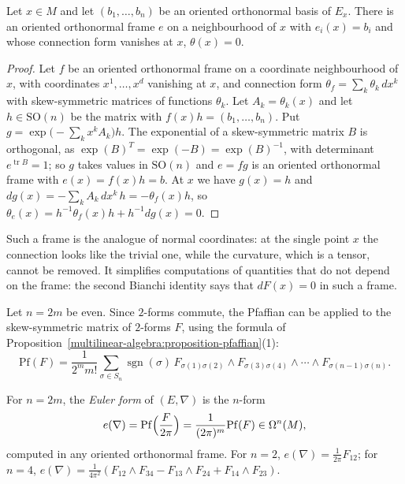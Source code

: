 \begin{lemma}\label{characteristic-classes:lemma-normal-frames}
Let $x \in M$ and let $(b_1, \ldots, b_n)$ be an oriented orthonormal basis of $E_x$. There is an oriented orthonormal frame $e$ on a neighbourhood of $x$ with $e_i(x) = b_i$ and whose
connection form vanishes at $x$, $\theta(x) = 0$.
\end{lemma}

\begin{proof}
Let $f$ be an oriented orthonormal frame on a coordinate neighbourhood of $x$, with coordinates $x^1, \ldots, x^d$ vanishing at $x$, and connection form $\theta_f = \sum_k\theta_k\,dx^k$
with skew-symmetric matrices of functions $\theta_k$. Let $A_k = \theta_k(x)$ and let $h \in \mathrm{SO}(n)$ be the matrix with $f(x)h = (b_1, \ldots, b_n)$. Put
$g = \exp\bigl(-\sum_kx^kA_k\bigr)h$. The exponential of a skew-symmetric matrix $B$ is orthogonal, as $\exp(B)^T = \exp(-B) = \exp(B)^{-1}$, with determinant $e^{\operatorname{tr}B} = 1$; so
$g$ takes values in $\mathrm{SO}(n)$ and $e = fg$ is an oriented orthonormal frame with $e(x) = f(x)h = b$. At $x$ we have $g(x) = h$ and $dg(x) = -\sum_kA_k\,dx^k\,h = -\theta_f(x)h$,
so $\theta_e(x) = h^{-1}\theta_f(x)h + h^{-1}dg(x) = 0$.
\end{proof}

Such a frame is the analogue of normal coordinates: at the single point $x$ the connection looks like the trivial one, while the curvature, which is a tensor, cannot be removed. It
simplifies computations of quantities that do not depend on the frame: the second Bianchi identity says that $dF(x) = 0$ in such a frame.

Let $n = 2m$ be even. Since $2$-forms commute, the Pfaffian can be applied to the skew-symmetric matrix of $2$-forms $F$, using the formula of
Proposition~\ref{multilinear-algebra:proposition-pfaffian}(1):
\[
\mathrm{Pf}(F) = \frac{1}{2^mm!}\sum_{\sigma \in S_n}\operatorname{sgn}(\sigma)\,F_{\sigma(1)\sigma(2)} \wedge F_{\sigma(3)\sigma(4)} \wedge \cdots \wedge F_{\sigma(n-1)\sigma(n)} .
\]

\begin{definition}\label{characteristic-classes:definition-euler-form}
For $n = 2m$, the \emph{Euler form} of $(E, \nabla)$ is the $n$-form
\[
e(\nabla) = \mathrm{Pf}\Bigl(\frac{F}{2\pi}\Bigr) = \frac{1}{(2\pi)^m}\mathrm{Pf}(F) \in \Omega^n(M),
\]
computed in any oriented orthonormal frame. For $n = 2$, $e(\nabla) = \frac{1}{2\pi}F_{12}$; for $n = 4$,
$e(\nabla) = \frac{1}{4\pi^2}(F_{12} \wedge F_{34} - F_{13} \wedge F_{24} + F_{14} \wedge F_{23})$.
\end{definition}

